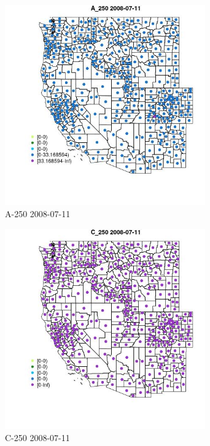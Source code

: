 \begin{figure} 
\centering  
\includegraphics[width=0.77\textwidth]{Code_Outputs/df_report_ML_predictors_CountyCentroid_Locations_Dates_2008-01-01to2018-12-31_MapObsA_2502008-07-11.jpg} 
\caption{\label{fig:df_report_ML_predictors_CountyCentroid_Locations_Dates_2008-01-01to2018-12-31MapObsA_2502008-07-11}A-250 2008-07-11} 
\end{figure} 
 

\begin{figure} 
\centering  
\includegraphics[width=0.77\textwidth]{Code_Outputs/df_report_ML_predictors_CountyCentroid_Locations_Dates_2008-01-01to2018-12-31_MapObsC_2502008-07-11.jpg} 
\caption{\label{fig:df_report_ML_predictors_CountyCentroid_Locations_Dates_2008-01-01to2018-12-31MapObsC_2502008-07-11}C-250 2008-07-11} 
\end{figure} 
 

